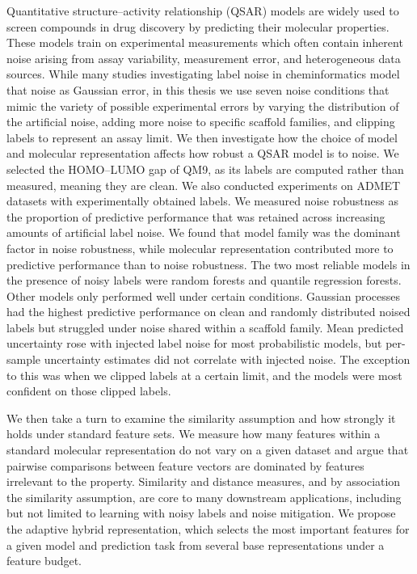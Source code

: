 \documentclass[a4paper,12pt]{report}
\begin{document}

Quantitative structure--activity relationship (QSAR) models are widely used to screen compounds in drug discovery by predicting their molecular properties. These models train on experimental measurements which often contain inherent noise arising from assay variability, measurement error, and heterogeneous data sources. While many studies investigating label noise in cheminformatics model that noise as Gaussian error, in this thesis we use seven noise conditions that mimic the variety of possible experimental errors by varying the distribution of the artificial noise, adding more noise to specific scaffold families, and clipping labels to represent an assay limit. We then investigate how the choice of model and molecular representation affects how robust a QSAR model is to noise. We selected the HOMO--LUMO gap of QM9, as its labels are computed rather than measured, meaning they are clean. We also conducted experiments on ADMET datasets with experimentally obtained labels. We measured noise robustness as the proportion of predictive performance that was retained across increasing amounts of artificial label noise. We found that model family was the dominant factor in noise robustness, while molecular representation contributed more to predictive performance than to noise robustness. The two most reliable models in the presence of noisy labels were random forests and quantile regression forests. Other models only performed well under certain conditions. Gaussian processes had the highest predictive performance on clean and randomly distributed noised labels but struggled under noise shared within a scaffold family. Mean predicted uncertainty rose with injected label noise for most probabilistic models, but per-sample uncertainty estimates did not correlate with injected noise. The exception to this was when we clipped labels at a certain limit, and the models were most confident on those clipped labels.

We then take a turn to examine the similarity assumption and how strongly it holds under standard feature sets. We measure how many features within a standard molecular representation do not vary on a given dataset and argue that pairwise comparisons between feature vectors are dominated by features irrelevant to the property. Similarity and distance measures, and by association the similarity assumption, are core to many downstream applications, including but not limited to learning with noisy labels and noise mitigation. We propose the adaptive hybrid representation, which selects the most important features for a given model and prediction task from several base representations under a feature budget.
\end{document}
